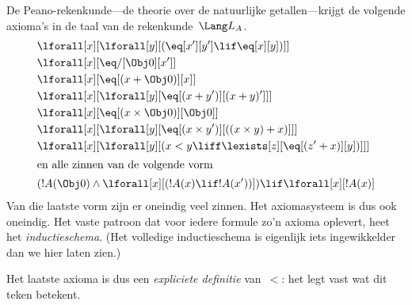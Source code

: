 \documentclass[../../../include/open-logic-section]{subfiles}
\begin{document}
\begin{ex}
De Peano-rekenkunde---de theorie over de natuurlijke getallen---krijgt
de volgende axioma's in de taal van de rekenkunde~$\Lang L_A$.
\begin{align*}
& \lforall[x][\lforall[y][(\eq[x'][y'] \lif \eq[x][y])]]\\
& \lforall[x][\eq/[\Obj 0][x']]\\
& \lforall[x][\eq[(x + \Obj 0)][x]]\\
& \lforall[x][\lforall[y][\eq[(x + y')][(x + y)']]]\\
& \lforall[x][\eq[(x \times \Obj 0)][\Obj 0]]\\
& \lforall[x][\lforall[y][\eq[(x \times y')][((x \times y) + x)]]]\\
& \lforall[x][\lforall[y][(x < y \liff \lexists[z][\eq[(z' + x)][y])]]]\\
\intertext{en alle zinnen van de volgende vorm}
& (!A(\Obj 0) \land \lforall[x][(!A(x) \lif !A(x'))]) \lif \lforall[x][!A(x)]
\end{align*}
Van die laatste vorm zijn er oneindig veel zinnen. Het axiomasysteem
is dus ook oneindig. Het vaste patroon dat voor iedere formule zo'n
axioma oplevert, heet het \emph{inductieschema}. (Het volledige
inductieschema is eigenlijk iets ingewikkelder dan we hier laten
zien.)

Het laatste axioma is dus een \emph{expliciete definitie} van~$<$: het
legt vast wat dit teken betekent.
\end{ex}
\end{document}
